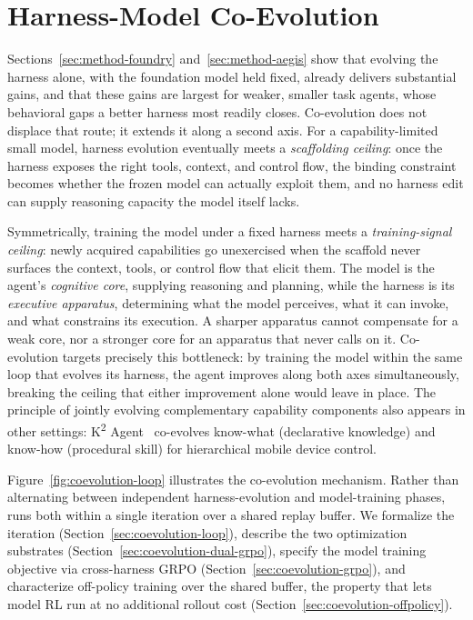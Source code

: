 \section{Harness-Model Co-Evolution}
\label{sec:method-coevolution}

Sections~\ref{sec:method-foundry} and~\ref{sec:method-aegis} show that evolving the harness alone, with the foundation model held fixed, already delivers substantial gains, and that these gains are largest for weaker, smaller task agents, whose behavioral gaps a better harness most readily closes. Co-evolution does not displace that route; it extends it along a second axis. For a capability-limited small model, harness evolution eventually meets a \textit{scaffolding ceiling}: once the harness exposes the right tools, context, and control flow, the binding constraint becomes whether the frozen model can actually exploit them, and no harness edit can supply reasoning capacity the model itself lacks.

Symmetrically, training the model under a fixed harness meets a \textit{training-signal ceiling}: newly acquired capabilities go unexercised when the scaffold never surfaces the context, tools, or control flow that elicit them. The model is the agent's \textit{cognitive core}, supplying reasoning and planning, while the harness is its \textit{executive apparatus}, determining what the model perceives, what it can invoke, and what constrains its execution. A sharper apparatus cannot compensate for a weak core, nor a stronger core for an apparatus that never calls on it. Co-evolution targets precisely this bottleneck: by training the model within the same loop that evolves its harness, the agent improves along both axes simultaneously, breaking the ceiling that either improvement alone would leave in place. The principle of jointly evolving complementary capability components also appears in other settings: K\textsuperscript{2} Agent~\cite{wu2026k} co-evolves know-what (declarative knowledge) and know-how (procedural skill) for hierarchical mobile device control.

Figure~\ref{fig:coevolution-loop} illustrates the co-evolution mechanism. Rather than alternating between independent harness-evolution and model-training phases, \ProjectName runs both within a single iteration over a shared replay buffer. We formalize the iteration (Section~\ref{sec:coevolution-loop}), describe the two optimization substrates (Section~\ref{sec:coevolution-dual-grpo}), specify the model training objective via cross-harness GRPO (Section~\ref{sec:coevolution-grpo}), and characterize off-policy training over the shared buffer, the property that lets model RL run at no additional rollout cost (Section~\ref{sec:coevolution-offpolicy}).

